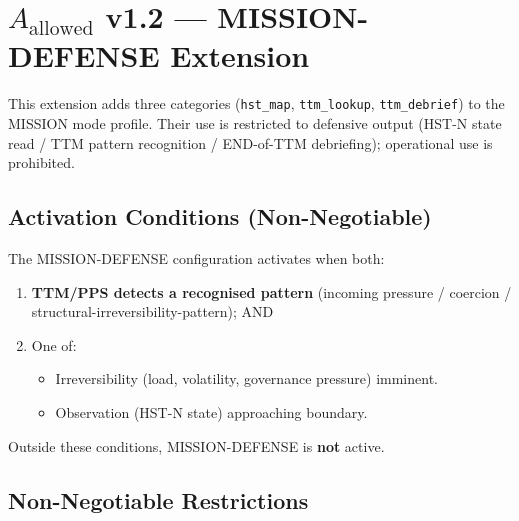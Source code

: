 
\section{$A_{\mathrm{allowed}}$ v1.2 --- MISSION-DEFENSE Extension}
\label{sec:mission-defense-c2}


This extension adds three categories
(\texttt{hst\_map}, \texttt{ttm\_lookup}, \texttt{ttm\_debrief}) to
the MISSION mode profile. Their use is restricted to defensive
output (HST-N state read / TTM pattern recognition / END-of-TTM
debriefing); operational use is prohibited.

\subsection{Activation Conditions (Non-Negotiable)}
\label{sec:mission-defense-conditions}

The MISSION-DEFENSE configuration activates when both:

\begin{enumerate}
\item \textbf{TTM/PPS detects a recognised pattern} (incoming
pressure / coercion / structural-irreversibility-pattern); AND
\item One of:
\begin{itemize}
\item Irreversibility (load, volatility, governance pressure)
imminent.
\item Observation (HST-N state) approaching boundary.
\end{itemize}
\end{enumerate}

\noindent
Outside these conditions, MISSION-DEFENSE is \textbf{not} active.

\subsection{Non-Negotiable Restrictions}
\label{sec:mission-defense-restrictions}

